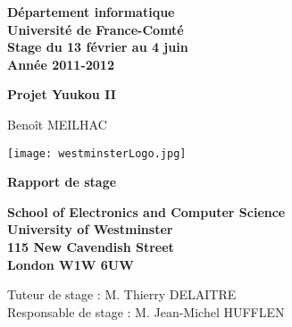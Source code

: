 \begin{titlepage}
    \centering

    \vspace{5mm}

	\normalsize{
		\textbf{
			D\'epartement informatique\\
			Universit\'e de France-Comt\'e\\
			Stage du 13 f\'evrier au 4 juin\\
			Ann\'ee 2011-2012
		}
	}

    \vspace{5mm}
	
    \Huge{
        \textbf{
            Projet Yuukou II
        }
    }

    \vspace{5mm}

    \normalsize{
        Beno\^it MEILHAC
    }

    \vspace{5mm}
	
    \begin{center} 
        \texttt{[image: westminsterLogo.jpg]}
	\end{center}
	
    \vspace{14mm}

    \Huge{
        \textbf{
            Rapport de stage
        }
	}

	\vspace{20mm}

    \normalsize{
        \textbf{
			School of Electronics and Computer Science\\
            University of Westminster\\
        	115 New Cavendish Street\\
			London W1W 6UW\\
        }
    }

	\vspace{5mm}

	\normalsize{	
	    Tuteur de stage : M. Thierry DELAITRE\\
		Responsable de stage : M. Jean-Michel HUFFLEN
	}

\end{titlepage}

\clearpage

